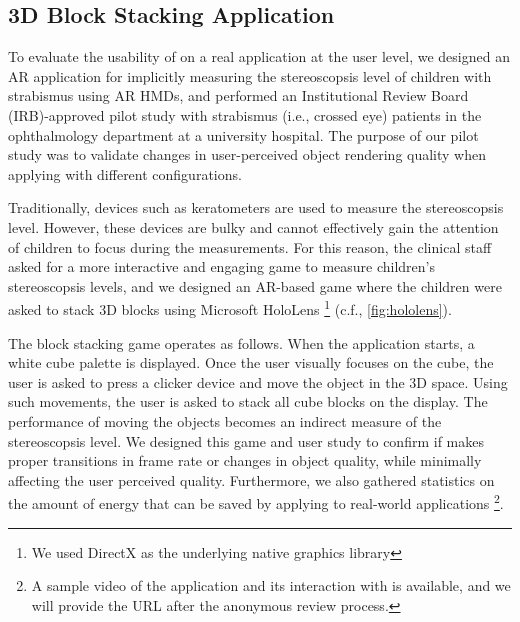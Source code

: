 \subsection{3D Block Stacking Application}
\label{sec:app}



To evaluate the usability of {\myit} on a real application at the user level,
we designed an AR application for implicitly measuring the stereoscopsis level 
of children with strabismus using AR HMDs, and performed an Institutional Review
Board (IRB)-approved pilot study with strabismus (i.e., crossed eye) patients in
the ophthalmology department at a university hospital.
%
The purpose of our pilot study was to validate changes in user-perceived
object rendering quality when applying {\myit} with different configurations.


Traditionally, devices such as keratometers are used to measure the 
stereoscopsis level. However, these devices are bulky and cannot effectively 
gain the attention of children to focus during the measurements.
%
For this reason, the clinical staff asked for a more interactive and engaging 
game to measure children's stereoscopsis levels, and we designed an AR-based 
game where the children were asked to stack 3D blocks using Microsoft HoloLens%
\footnote{We used DirectX as the underlying native graphics library}
(c.f., \fig\ref{fig:hololens}).


The block stacking game operates as follows.
%
When the application starts, a white cube palette is displayed.
Once the user visually focuses on the cube, the user is asked to press a clicker
device and move the object in the 3D space.
%
Using such movements, the user is asked to stack all cube blocks on the display.
The performance of moving the objects becomes an indirect measure of the 
stereoscopsis level. 
%
We designed this game and user study to confirm if {\myit} makes proper 
transitions in frame rate or changes in object quality, while minimally 
affecting the user perceived quality.
%
Furthermore, we also gathered statistics on the amount of energy 
that can be saved by applying {\myit} to real-world applications%
\footnote{A sample video of the application and its interaction with {\myit} is
available, and we will provide the URL after the anonymous review process.
}.

